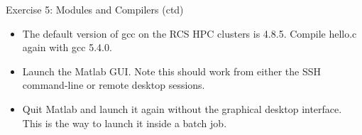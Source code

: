 \documentclass[handout]{beamer} %
\begin{document}
{
%
\begin{frame}{Exercise 5: Modules and Compilers (ctd)}
  \begin{itemize}
  \item{The default version of gcc on the RCS HPC clusters is 4.8.5. Compile hello.c again with \alert{gcc 5.4.0}.}
\item{Launch the Matlab GUI. Note this should work from either the SSH command-line or remote desktop sessions.}
\item{Quit Matlab and launch it again without the graphical desktop interface. This is the way to launch it inside a batch job.}
\end{itemize}
\end{frame}
}
\end{document}

